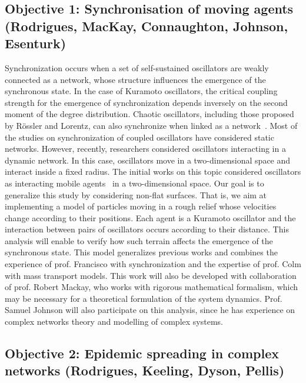 \subsection{Objective 1:  Synchronisation of moving agents (Rodrigues, MacKay, 
Connaughton, Johnson, Esenturk)}
Synchronization occurs when a set of self-sustained oscillators are weakly 
connected as a network, whose structure influences the emergence of the 
synchronous state. In the case of Kuramoto oscillators, the critical coupling 
strength for the emergence of synchronization depends inversely on the second 
moment of the degree distribution. Chaotic oscillators, including those 
proposed by R\"{o}ssler and Lorentz, can also synchronize when linked as a 
network~\cite{Arenas08}. Most of the studies on synchronization of coupled 
oscillators have considered static networks. However, recently, researchers 
considered oscillators interacting in a dynamic network. In this case, 
oscillators move in a two-dimensional space and interact inside a fixed radius. 
The initial works on this topic considered oscillators as interacting mobile 
agents~\cite{Levis017} in a two-dimensional space. Our goal is to generalize 
this study by considering non-flat surfaces. That is, we aim at implementing a 
model of particles moving in a rough relief whose velocities change according 
to their positions. Each agent is a Kuramoto oscillator and the interaction 
between pairs of oscillators occurs according to their distance. This analysis 
will enable to verify how such terrain affects the emergence of the synchronous 
state. This model generalizes previous works and combines the experience of 
prof. Francisco with synchronization and the expertise of prof. Colm with mass 
transport models. This work will also be developed with collaboration of prof. 
Robert Mackay, who works with rigorous mathematical formalism, which may be 
necessary for a theoretical formulation of the system dynamics. Prof. Samuel 
Johnson will also participate on this analysis, since he has experience on 
complex networks theory and modelling of complex systems.

\subsection{Objective 2: Epidemic spreading in complex networks (Rodrigues, 
Keeling, Dyson, Pellis)}

